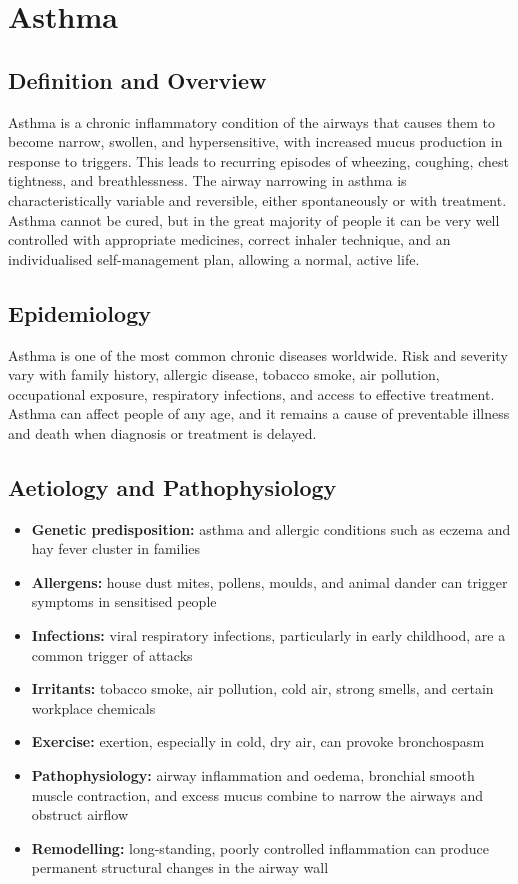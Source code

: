 \chapter{Asthma}

\section*{Definition and Overview}
Asthma is a chronic inflammatory condition of the airways that causes them to become narrow, swollen, and hypersensitive, with increased mucus production in response to triggers. This leads to recurring episodes of wheezing, coughing, chest tightness, and breathlessness. The airway narrowing in asthma is characteristically variable and reversible, either spontaneously or with treatment. Asthma cannot be cured, but in the great majority of people it can be very well controlled with appropriate medicines, correct inhaler technique, and an individualised self-management plan, allowing a normal, active life.

\section*{Epidemiology}
Asthma is one of the most common chronic diseases worldwide. Risk and severity vary with family history, allergic disease, tobacco smoke, air pollution, occupational exposure, respiratory infections, and access to effective treatment. Asthma can affect people of any age, and it remains a cause of preventable illness and death when diagnosis or treatment is delayed.

\section*{Aetiology and Pathophysiology}
\begin{itemize}
    \item \textbf{Genetic predisposition:} asthma and allergic conditions such as eczema and hay fever cluster in families
    \item \textbf{Allergens:} house dust mites, pollens, moulds, and animal dander can trigger symptoms in sensitised people
    \item \textbf{Infections:} viral respiratory infections, particularly in early childhood, are a common trigger of attacks
    \item \textbf{Irritants:} tobacco smoke, air pollution, cold air, strong smells, and certain workplace chemicals
    \item \textbf{Exercise:} exertion, especially in cold, dry air, can provoke bronchospasm
    \item \textbf{Pathophysiology:} airway inflammation and oedema, bronchial smooth muscle contraction, and excess mucus combine to narrow the airways and obstruct airflow
    \item \textbf{Remodelling:} long-standing, poorly controlled inflammation can produce permanent structural changes in the airway wall
\end{itemize}

